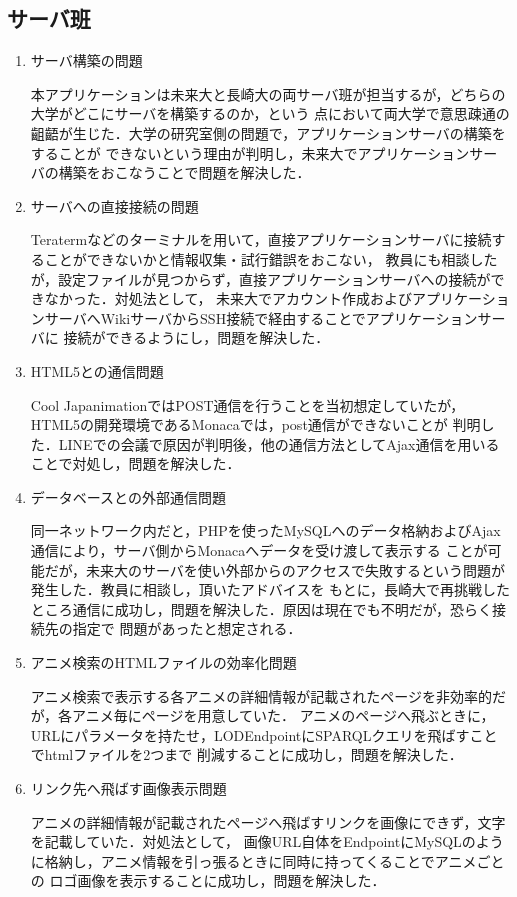\subsection{サーバ班}
\begin{enumerate}

\item サーバ構築の問題
\par
本アプリケーションは未来大と長崎大の両サーバ班が担当するが，どちらの大学がどこにサーバを構築するのか，という
点において両大学で意思疎通の齟齬が生じた．大学の研究室側の問題で，アプリケーションサーバの構築をすることが
できないという理由が判明し，未来大でアプリケーションサーバの構築をおこなうことで問題を解決した．

\item サーバへの直接接続の問題
\par
Teratermなどのターミナルを用いて，直接アプリケーションサーバに接続することができないかと情報収集・試行錯誤をおこない，
教員にも相談したが，設定ファイルが見つからず，直接アプリケーションサーバへの接続ができなかった．対処法として，
未来大でアカウント作成およびアプリケーションサーバへWikiサーバからSSH接続で経由することでアプリケーションサーバに
接続ができるようにし，問題を解決した．

\item HTML5との通信問題
\par
Cool JapanimationではPOST通信を行うことを当初想定していたが，HTML5の開発環境であるMonacaでは，post通信ができないことが
判明した．LINEでの会議で原因が判明後，他の通信方法としてAjax通信を用いることで対処し，問題を解決した．

\item データベースとの外部通信問題
\par
同一ネットワーク内だと，PHPを使ったMySQLへのデータ格納およびAjax通信により，サーバ側からMonacaへデータを受け渡して表示する
ことが可能だが，未来大のサーバを使い外部からのアクセスで失敗するという問題が発生した．教員に相談し，頂いたアドバイスを
もとに，長崎大で再挑戦したところ通信に成功し，問題を解決した．原因は現在でも不明だが，恐らく接続先の指定で
問題があったと想定される．

\item アニメ検索のHTMLファイルの効率化問題
\par
アニメ検索で表示する各アニメの詳細情報が記載されたページを非効率的だが，各アニメ毎にページを用意していた．
アニメのページへ飛ぶときに，URLにパラメータを持たせ，LODEndpointにSPARQLクエリを飛ばすことでhtmlファイルを2つまで
削減することに成功し，問題を解決した．

\item リンク先へ飛ばす画像表示問題
\par
アニメの詳細情報が記載されたページへ飛ばすリンクを画像にできず，文字を記載していた．対処法として，
画像URL自体をEndpointにMySQLのように格納し，アニメ情報を引っ張るときに同時に持ってくることでアニメごとの
ロゴ画像を表示することに成功し，問題を解決した．

\end{enumerate}
